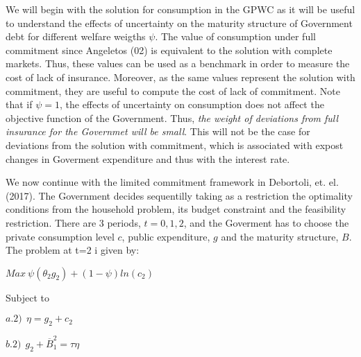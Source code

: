 \documentclass[11pt,letterpaper]{article}
\begin{document}
We will begin with the solution for consumption in the GPWC as it will be useful to understand the effects of uncertainty on the maturity structure of Government debt for different welfare weigths $\psi$. The value of consumption under full commitment since Angeletos (02) is equivalent to the solution with complete markets. Thus, these values can be used as a benchmark in order to measure the cost of lack of insurance. Moreover, as the same values represent the solution with commitment, they are useful to compute the cost of lack of commitment. Note that if $\psi=1$, the effects of uncertainty on consumption does not affect the objective function of the Government. Thus, \textit{the weight of deviations from full insurance for the Governmet will be small}. This will not be the case for deviations from the solution with commitment, which is associated with expost changes in Goverment expenditure and thus with the interest rate.

\bigskip



We now continue with the limited commitment framework in Debortoli, et. el. (2017). The Government decides sequentilly taking as a restriction the optimality conditions from the household problem, its budget constraint and the feasibility restriction. There are 3 periods, $t=0,1,2$, and the Goverment has to choose the private consumption level $c$, public expenditure, $g$ and the maturity structure, $B$. The problem at t=2 i given by:

\bigskip

\begin{center}

$Max \ \psi(\theta _2g_2)+ (1-\psi)ln(c_2)$

\end{center}

\bigskip

Subject to

\begin{center}

$a.2) \ \  \eta=g_2+c_2  $

\end{center}

\bigskip


\begin{center}

$ b.2) \ \  g_2+\overline{B}^{2}_{1}=\tau \eta  $

\end{center}

\bigskip
\end{document}
